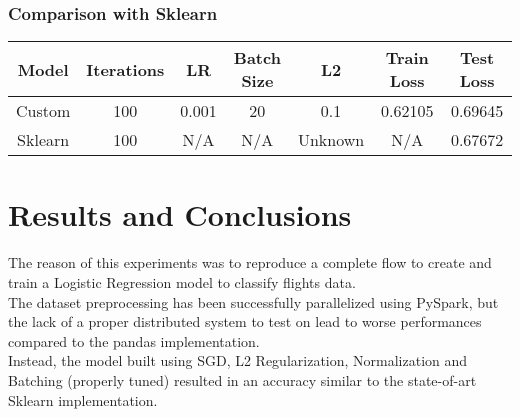 \documentclass[
	letterpaper, %
	10pt, %
]{class}
\begin{document}
\subsubsection{Comparison with Sklearn}

\begin{center}
	\begin{tabular}{ |c|c|c|c|c|c|c| }
		\hline
		Model   & Iterations & LR    & Batch Size & L2      & Train Loss & Test Loss \\
		\hline
		Custom  & 100        & 0.001 & 20         & 0.1     & 0.62105    & 0.69645   \\
		Sklearn & 100        & N/A   & N/A        & Unknown & N/A        & 0.67672   \\
		\hline
	\end{tabular}
\end{center}



\section{Results and Conclusions}

The reason of this experiments was to reproduce a complete flow to create and train a Logistic Regression model to classify flights data.\\
The dataset preprocessing has been successfully parallelized using PySpark, but the lack of a proper distributed system to test on lead to worse performances compared to the pandas implementation.\\
Instead, the model built using SGD, L2 Regularization, Normalization and Batching (properly tuned) resulted in an accuracy similar to the state-of-art Sklearn implementation.


\printbibliography %


\end{document}
